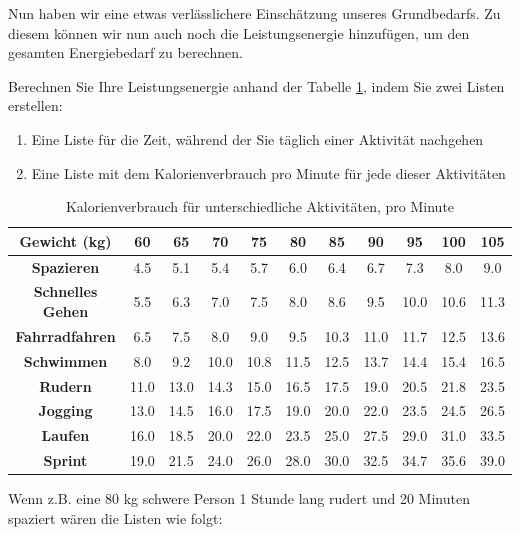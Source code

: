 Nun haben wir eine etwas verlässlichere Einschätzung unseres Grundbedarfs. Zu diesem können wir nun auch noch die Leistungsenergie hinzufügen, um den gesamten Energiebedarf zu berechnen.

\begin{myexercise}\label{ex:leistungsumsatz}
	Berechnen Sie Ihre Leistungsenergie anhand der Tabelle \ref{tab:kcal}, indem Sie zwei Listen erstellen:
	\begin{enumerate}
		\item Eine Liste für die Zeit, während der Sie täglich einer Aktivität nachgehen
		\item Eine Liste mit dem Kalorienverbrauch pro Minute für jede dieser Aktivitäten
	\end{enumerate}

	\begin{table}[H]
		\centering
		\begin{tabular}{c|*{10}{c}}
			\textbf{Gewicht (kg)}    & 60   & 65   & 70   & 75   & 80   & 85   & 90   & 95   & 100  & 105  \\
			\midrule\midrule
			\textbf{Spazieren}       & 4.5  & 5.1  & 5.4  & 5.7  & 6.0  & 6.4  & 6.7  & 7.3  & 8.0  & 9.0  \\
			\midrule
			\textbf{Schnelles Gehen} & 5.5  & 6.3  & 7.0  & 7.5  & 8.0  & 8.6  & 9.5  & 10.0 & 10.6 & 11.3 \\
			\midrule
			\textbf{Fahrradfahren}   & 6.5  & 7.5  & 8.0  & 9.0  & 9.5  & 10.3 & 11.0 & 11.7 & 12.5 & 13.6 \\
			\midrule
			\textbf{Schwimmen}       & 8.0  & 9.2  & 10.0 & 10.8 & 11.5 & 12.5 & 13.7 & 14.4 & 15.4 & 16.5 \\
			\midrule
			\textbf{Rudern}          & 11.0 & 13.0 & 14.3 & 15.0 & 16.5 & 17.5 & 19.0 & 20.5 & 21.8 & 23.5 \\
			\midrule
			\textbf{Jogging}         & 13.0 & 14.5 & 16.0 & 17.5 & 19.0 & 20.0 & 22.0 & 23.5 & 24.5 & 26.5 \\
			\midrule
			\textbf{Laufen}          & 16.0 & 18.5 & 20.0 & 22.0 & 23.5 & 25.0 & 27.5 & 29.0 & 31.0 & 33.5 \\
			\midrule
			\textbf{Sprint}          & 19.0 & 21.5 & 24.0 & 26.0 & 28.0 & 30.0 & 32.5 & 34.7 & 35.6 & 39.0 \\
		\end{tabular}
		\caption{Kalorienverbrauch für unterschiedliche Aktivitäten, pro Minute}
		\label{tab:kcal}
	\end{table}
	Wenn z.B. eine 80 kg schwere Person 1 Stunde lang rudert und 20 Minuten spaziert wären die Listen wie folgt:

\end{myexercise}
